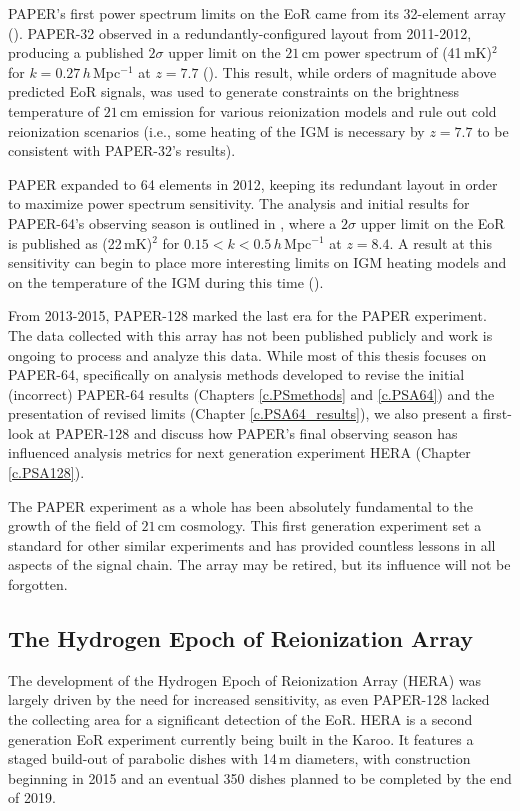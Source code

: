 PAPER's first power spectrum limits on the EoR came from its 32-element array (\citealt{parsons_et_al2014}). PAPER-32 observed in a redundantly-configured layout from 2011-2012, producing a published $2\sigma$ upper limit on the $21$\,cm power spectrum of (41\,mK)$^{2}$ for $k=0.27\, h$\,Mpc$^{-1}$ at $z=7.7$ (\citealt{parsons_et_al2014}). This result, while orders of magnitude above predicted EoR signals, was used to generate constraints on the brightness temperature of $21$\,cm emission for various reionization models and rule out cold reionization scenarios (i.e., some heating of the IGM is necessary by $z=7.7$ to be consistent with PAPER-32's results).

PAPER expanded to 64 elements in 2012, keeping its redundant layout in order to maximize power spectrum sensitivity. The analysis and initial results for PAPER-64's observing season is outlined in \citealt{ali_et_al2015}, where a $2\sigma$ upper limit on the EoR is published as (22\,mK)$^{2}$ for $0.15 < k < 0.5\,h$\,Mpc$^{-1}$ at $z=8.4$. A result at this sensitivity can begin to place more interesting limits on IGM heating models and on the temperature of the IGM during this time (\citealt{pober_et_al2015}).

From 2013-2015, PAPER-128 marked the last era for the PAPER experiment. The data collected with this array has not been published publicly and work is ongoing to process and analyze this data. While most of this thesis focuses on PAPER-64, specifically on analysis methods developed to revise the initial (incorrect) PAPER-64 results (Chapters \ref{c.PSmethods} and \ref{c.PSA64}) and the presentation of revised limits (Chapter \ref{c.PSA64_results}), we also present a first-look at PAPER-128 and discuss how PAPER's final observing season has influenced analysis metrics for next generation experiment HERA (Chapter \ref{c.PSA128}).

The PAPER experiment as a whole has been absolutely fundamental to the growth of the field of $21$\,cm cosmology. This first generation experiment set a standard for other similar experiments and has provided countless lessons in all aspects of the signal chain. The array may be retired, but its influence will not be forgotten.

\subsection{The Hydrogen Epoch of Reionization Array}

The development of the Hydrogen Epoch of Reionization Array (HERA) was largely driven by the need for increased sensitivity, as even PAPER-128 lacked the collecting area for a significant detection of the EoR. HERA is a second generation EoR experiment currently being built in the Karoo. It features a staged build-out of parabolic dishes with 14\,m diameters, with construction beginning in 2015 and an eventual 350 dishes planned to be completed by the end of 2019.

